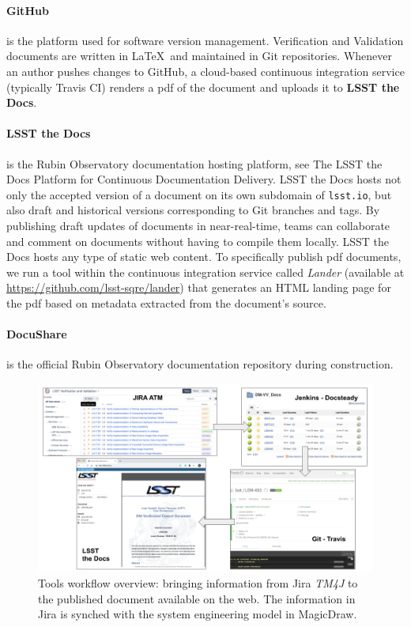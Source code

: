 \paragraph{GitHub}
is the platform used for software version management.
Verification and Validation documents are written in \LaTeX~and maintained in Git repositories.
Whenever an author pushes changes to GitHub, a cloud-based continuous integration service 
(typically Travis CI) renders a pdf of the document and uploads it to \textbf{LSST the Docs}.

\paragraph{LSST the Docs}
is the Rubin Observatory documentation hosting platform, see The LSST the Docs Platform for Continuous Documentation Delivery\cite{SQR-006}.
LSST the Docs hosts not only the accepted version of a document on its own subdomain of \texttt{lsst.io}, but also draft and
historical versions corresponding to Git branches and tags.
By publishing draft updates of documents in near-real-time, teams can collaborate and comment on documents without having to
compile them locally.
LSST the Docs hosts any type of static web content.
To specifically publish pdf documents, we run a tool within the continuous integration service called \textit{Lander}
(available at \url{https://github.com/lsst-sqre/lander})
that generates an HTML landing page for the pdf based on metadata extracted from the document's source.

\paragraph{DocuShare}
is the official Rubin Observatory documentation repository during construction.

\begin{figure}
\begin{center}
\includegraphics[width=\textwidth]{imgs/screenshots.png}
 \caption{Tools workflow overview: bringing information from Jira \textit{TM4J} to the published document available on the web. The information in Jira is synched with the system engineering model in MagicDraw.}
 \label{fig:overview}
\end{center}
\end{figure}


